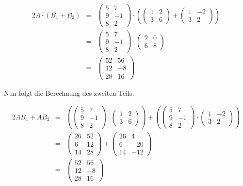 \documentclass[10pt,a4paper,oneside,ngerman,numbers=noenddot]{scrartcl}
\begin{document}
\begin{alignat*}{2}
A \cdot (B_{1} + B_{2}) &=& \begin{pmatrix} 5 & 7 \\ 9 & -1 \\ 8 & 2 \end{pmatrix} \cdot \left( \begin{pmatrix} 1 & 2 \\ 3 & 6 \end{pmatrix} + \begin{pmatrix} 1 & -2 \\ 3 & 2 \end{pmatrix} \right)\\
&=& \begin{pmatrix} 5 & 7 \\ 9 & -1 \\ 8 & 2 \end{pmatrix} \cdot \begin{pmatrix} 2 & 0 \\ 6 & 8 \end{pmatrix} \\
&=& \begin{pmatrix} 52 & 56 \\ 12 & -8 \\ 28 & 16 \end{pmatrix}
\end{alignat*}

Nun folgt die Berechnung des zweiten Teils.

\begin{alignat*}{2}
AB_{1} + AB_{2} &=& \left( \begin{pmatrix} 5 & 7 \\ 9 & -1 \\ 8 & 2 \end{pmatrix} \cdot \begin{pmatrix} 1 & 2 \\ 3 & 6 \end{pmatrix} \right) + \left(\begin{pmatrix} 5 & 7 \\ 9 & -1 \\ 8 & 2 \end{pmatrix} \cdot \begin{pmatrix} 1 & -2 \\ 3 & 2 \end{pmatrix} \right)\\
&=& \begin{pmatrix} 26 & 52 \\ 6 & 12 \\ 14 & 28 \end{pmatrix} + \begin{pmatrix} 26 & 4 \\ 6 & -20 \\ 14 & -12 \end{pmatrix} \\
&=& \begin{pmatrix} 52 & 56 \\ 12 & -8 \\ 28 & 16 \end{pmatrix}
\end{alignat*}
\end{document}
